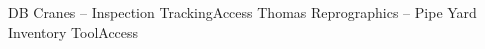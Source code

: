%
%
%
%
%
\justifiedsubsection%
{DB Cranes -- Inspection Tracking}{Access}
%
%
%
%
\justifiedsubsection%
{Thomas Reprographics -- Pipe Yard Inventory Tool}{Access}
%
%
%
%